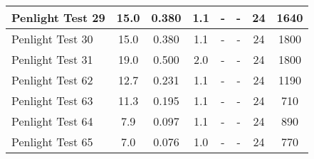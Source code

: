 \begin{table}[!ht]
\begin{center}
\begin{tabular}{|l|c|c|c|c|c|c|c|}
Penlight Test 29  &  15.0      &  0.380        &  1.1        &  -         &  -          &  24           &  1640       \\ \hline
Penlight Test 30  &  15.0      &  0.380        &  1.1        &  -         &  -          &  24           &  1800       \\ \hline
Penlight Test 31  &  19.0      &  0.500        &  2.0        &  -         &  -          &  24           &  1800       \\ \hline
Penlight Test 62  &  12.7      &  0.231        &  1.1        &  -         &  -          &  24           &  1190       \\ \hline
Penlight Test 63  &  11.3      &  0.195        &  1.1        &  -         &  -          &  24           &  710        \\ \hline
Penlight Test 64  &   7.9      &  0.097        &  1.1        &  -         &  -          &  24           &  890        \\ \hline
Penlight Test 65  &   7.0      &  0.076        &  1.0        &  -         &  -          &  24           &  770        \\ \hline
\end{tabular}
\end{center}
\end{table}


\clearpage


